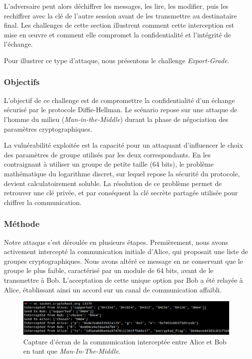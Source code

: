     L'adversaire peut alors déchiffrer les messages, les lire, les modifier, puis
    les rechiffrer avec la clé de l'autre session avant de les transmettre au
    destinataire final. Les challenges de cette section illustrent comment
    cette interception est mise en œuvre et comment elle compromet la
    confidentialité et l'intégrité de l'échange.

    Pour illustrer ce type d'attaque, nous présentons le challenge \textit{Export-Grade}.

    \subsubsection{Objectifs}
    L'objectif de ce challenge est de compromettre la confidentialité d'un
    échange sécurisé par le protocole Diffie-Hellman. Le scénario repose sur
    une attaque de l'homme du milieu (\textit{Man-in-the-Middle}) durant la phase de
    négociation des paramètres cryptographiques.

    La vulnérabilité exploitée est la capacité pour un attaquant d'influencer
    le choix des paramètres de groupe utilisés par les deux correspondants. En
    les contraignant à utiliser un groupe de petite taille (64 bits), le
    problème mathématique du logarithme discret, sur lequel repose la sécurité
    du protocole, devient calculatoirement soluble. La résolution de ce
    problème permet de retrouver une clé privée, et par conséquent la clé
    secrète partagée utilisée pour chiffrer la communication.

    \subsubsection{Méthode}
    Notre attaque s'est déroulée en plusieurs étapes. Premièrement, nous avons
    activement intercepté la communication initiale d'Alice, qui proposait une
    liste de groupes cryptographiques. Nous avons altéré ce message en ne
    conservant que le groupe le plus faible, caractérisé par un module de 64
    bits, avant de le transmettre à Bob. L'acceptation de cette unique option
    par Bob a été relayée à Alice, établissant ainsi un accord sur un canal de
    communication affaibli.

        \begin{figure}[H]
            \centering
            \includegraphics[width=0.95\linewidth]{Images/DiffieHellman/capture_mitm.png}

            \caption{Capture d'écran de la communication interceptée entre Alice et Bob en tant que \textit{Man-In-The-Middle}.}

            \label{fig:mitmChallenge}
        \end{figure}

